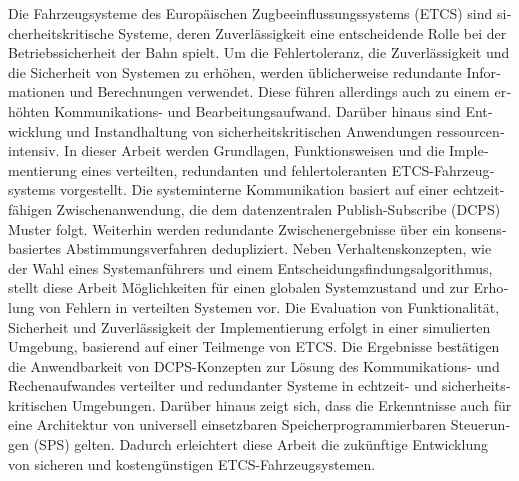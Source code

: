 \null\vfil
\begin{otherlanguage}{ngerman}
\begin{center}\textsf{\textbf{\abstractname}}\end{center}

\noindent 
{}
Die Fahrzeugsysteme des Europäischen Zugbeeinflussungssystems (ETCS) sind sicherheitskritische Systeme, deren Zuverlässigkeit eine entscheidende Rolle bei der Betriebssicherheit der Bahn spielt.
Um die Fehlertoleranz, die Zuverlässigkeit und die Sicherheit von Systemen zu erhöhen, werden üblicherweise redundante Informationen und Berechnungen verwendet.
Diese führen allerdings auch zu einem erhöhten Kommunikations- und Bearbeitungsaufwand.
Darüber hinaus sind Entwicklung und Instandhaltung von sicherheitskritischen Anwendungen ressourcenintensiv.
In dieser Arbeit werden Grundlagen, Funktionsweisen und die Implementierung eines verteilten, redundanten und fehlertoleranten ETCS-Fahrzeugsystems vorgestellt.
Die systeminterne Kommunikation basiert auf einer echtzeitfähigen Zwischenanwendung, die dem datenzentralen Publish-Subscribe (DCPS) Muster folgt.
Weiterhin werden redundante Zwischenergebnisse über ein konsensbasiertes Abstimmungsverfahren dedupliziert.
Neben Verhaltenskonzepten, wie der Wahl eines Systemanführers und einem Entscheidungsfindungsalgorithmus, stellt diese Arbeit Möglichkeiten für einen globalen Systemzustand und zur Erholung von Fehlern in verteilten Systemen vor.
Die Evaluation von Funktionalität, Sicherheit und Zuverlässigkeit der Implementierung erfolgt in einer simulierten Umgebung, basierend auf einer Teilmenge von ETCS.
Die Ergebnisse bestätigen die Anwendbarkeit von DCPS-Konzepten zur Lösung des Kommunikations- und Rechenaufwandes verteilter und redundanter Systeme in echtzeit- und sicherheitskritischen Umgebungen.
Darüber hinaus zeigt sich, dass die Erkenntnisse auch für eine Architektur von universell einsetzbaren Speicherprogrammierbaren Steuerungen (SPS) gelten. 
Dadurch erleichtert diese Arbeit die zukünftige Entwicklung von sicheren und kostengünstigen ETCS-Fahrzeugsystemen.

\end{otherlanguage}
\vfil\null



